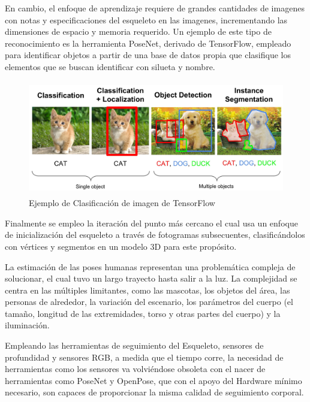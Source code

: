 En cambio, el enfoque de aprendizaje requiere de grandes cantidades de imagenes con notas y especificaciones del esqueleto en las imagenes, incrementando las dimensiones de espacio y memoria requerido. Un ejemplo de este tipo de reconocimiento es la herramienta PoseNet, derivado de TensorFlow, empleado para identificar objetos a partir de una base de datos propia que clasifique los elementos que se buscan identificar con silueta y nombre.

\begin{figure}[t!]
	\centering
	\includegraphics[width=13cm,height=5cm,]{./Images/ejemplotensorflow.jpg}
	\caption{Ejemplo de Clasificación de imagen de TensorFlow}
	\label{tensorfl}
\end{figure}

Finalmente se empleo la iteración del punto más cercano \cite{grest2005nonlinear} el cual usa un enfoque de inicialización del esqueleto a través de fotogramas subsecuentes, clasificándolos con vértices y segmentos en un modelo 3D para este propósito.

La estimación de las poses humanas representan una problemática compleja de solucionar, el cual tuvo un largo trayecto hasta salir a la luz. La complejidad se centra en las múltiples limitantes, como las mascotas, los objetos del área, las personas de alrededor, la variación del escenario, los parámetros del cuerpo (el tamaño, longitud de las extremidades, torso y otras partes del cuerpo) y la iluminación.

Empleando las herramientas de seguimiento del Esqueleto, sensores de profundidad y sensores RGB, a medida que el tiempo corre, la necesidad de herramientas como los sensores va volviéndose obsoleta con el nacer de herramientas como PoseNet y OpenPose, que con el apoyo del Hardware mínimo necesario, son capaces de proporcionar la misma calidad de seguimiento corporal.


